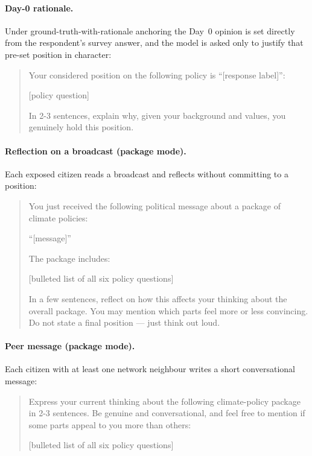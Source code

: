 \documentclass[pdflatex,sn-mathphys-num]{sn-jnl}%
\theoremstyle{thmstyleone}%
\theoremstyle{thmstyletwo}%
\theoremstyle{thmstylethree}%
\begin{document}
\paragraph{Day-0 rationale.}
Under ground-truth-with-rationale anchoring the Day~0 opinion is set directly from
the respondent's survey answer, and the model is asked only to justify that pre-set
position in character:
\begin{quote}\small
Your considered position on the following policy is ``[response label]'':

[policy question]

In 2-3 sentences, explain why, given your background and values, you genuinely hold
this position.
\end{quote}

\paragraph{Reflection on a broadcast (package mode).}
Each exposed citizen reads a broadcast and reflects without committing to a
position:
\begin{quote}\small
You just received the following political message about a package of climate
policies:

``[message]''

The package includes:

[bulleted list of all six policy questions]

In a few sentences, reflect on how this affects your thinking about the overall
package. You may mention which parts feel more or less convincing. Do not state a
final position --- just think out loud.
\end{quote}

\paragraph{Peer message (package mode).}
Each citizen with at least one network neighbour writes a short conversational
message:
\begin{quote}\small
Express your current thinking about the following climate-policy package in 2-3
sentences. Be genuine and conversational, and feel free to mention if some parts
appeal to you more than others:

[bulleted list of all six policy questions]
\end{quote}
\end{document}

